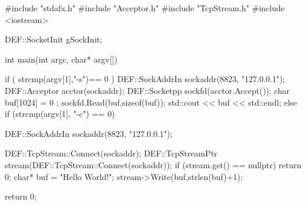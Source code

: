 \documentclass[10pt,fontset=adobe,UTF8]{ctexbook}
\begin{document}
\begin{smallcode}
#include "stdafx.h"
#include "Acceptor.h"
#include "TcpStream.h"
#include <iostream>
 
DEF::SocketInit gSockInit;
 
 
int main(int argc, char* argv[])
{
    if ( strcmp(argv[1],"-s")== 0 )
    {
        DEF::SockAddrIn sockaddr(8823, "127.0.0.1");
        DEF::Acceptor acctor(sockaddr);
        DEF::Socketpp sockfd(acctor.Accept());
        char buf[1024] = { 0 };
        sockfd.Read(buf,sizeof(buf));
        std::cout << buf << std::endl;
    }
    else if (strcmp(argv[1], "-c") == 0)
    {
        DEF::SockAddrIn sockaddr(8823, "127.0.0.1");
 
        DEF::TcpStream::Connect(sockaddr);
        DEF::TcpStreamPtr stream(DEF::TcpStream::Connect(sockaddr));
        if (stream.get() == nullptr)
            return 0;
        char* buf = "Hello World!";
        stream->Write(buf,strlen(buf)+1);
    }
 
     
    return 0;
}
\end{smallcode}

\end{document}
